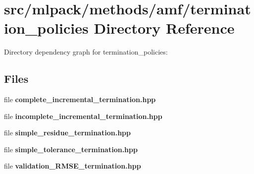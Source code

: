\section{src/mlpack/methods/amf/termination\-\_\-policies Directory Reference}
\label{dir_b57640d7a54017b760a7e3a8e9716011}
Directory dependency graph for termination\-\_\-policies\-:
\subsection*{Files}
\begin{DoxyCompactItemize}
\item 
file {\bf complete\-\_\-incremental\-\_\-termination.\-hpp}
\item 
file {\bf incomplete\-\_\-incremental\-\_\-termination.\-hpp}
\item 
file {\bf simple\-\_\-residue\-\_\-termination.\-hpp}
\item 
file {\bf simple\-\_\-tolerance\-\_\-termination.\-hpp}
\item 
file {\bf validation\-\_\-\-R\-M\-S\-E\-\_\-termination.\-hpp}
\end{DoxyCompactItemize}
